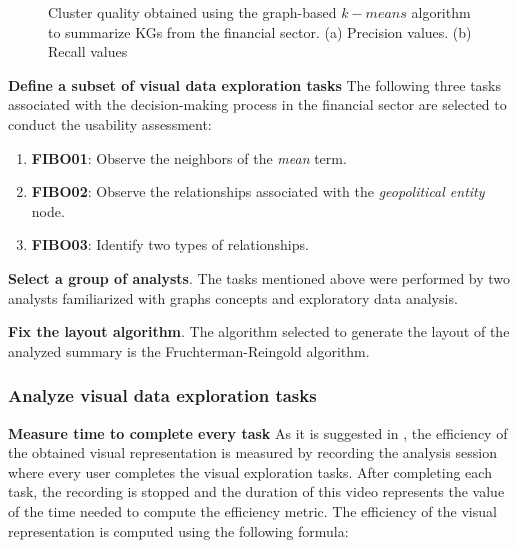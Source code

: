 \documentclass{ieeeaccess}
\begin{document}
\begin{figure*}[!h]
{\begin{subfigure}[pt]{0.45\linewidth}
    \caption{}
    \label{fig:Recall}
\end{subfigure}
}


\caption{Cluster quality obtained using the graph-based $k-means$ algorithm to summarize KGs from the financial sector. (a) Precision values. (b) Recall values}
\label{fig:ClustersQualityClassical}
\end{figure*}

\textbf{Define a subset of visual data exploration tasks}
The following three tasks associated with the decision-making 
process in the financial sector are selected to conduct
the usability assessment:

\begin{enumerate}
    \item \textbf{FIBO01}: Observe the neighbors of the \textit{mean} term.
    \item \textbf{FIBO02}: Observe the relationships associated with the \textit{geopolitical entity} node. 
    \item \textbf{FIBO03}: Identify two types of relationships.
\end{enumerate}

\textbf{Select a group of analysts}. The tasks mentioned above were performed by
two analysts familiarized with graphs concepts and exploratory data analysis.

\textbf{Fix the layout algorithm}. The algorithm selected to generate the layout of the 
analyzed summary is the Fruchterman-Reingold algorithm.

\subsubsection{Analyze visual data exploration tasks}
\textbf{Measure time to complete every task}
As it is suggested in \cite{Camarillo20}, the efficiency of the obtained visual representation 
is measured by recording the analysis session where every user completes the visual exploration
tasks. After completing each task, the recording is stopped and the duration of this video represents
the value of the time needed to compute the efficiency metric. The efficiency of the visual 
representation is computed using the following formula:
\end{document}

